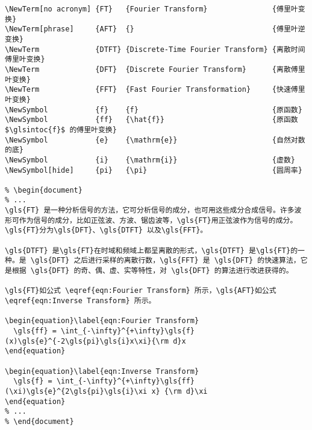 \documentclass{article}
\begin{document}
\begin{lstlisting}[style   = latexcode,
                   caption = {应用举例的 \LaTeX{} 代码},
                   label   = {lst:LaTeX Code of Example}]
% \NewTerm 和 \NewSymbol 需要放在导言区 
\NewTerm[no acronym] {FT}   {Fourier Transform}               {傅里叶变换}
\NewTerm[phrase]     {AFT}  {}                                {傅里叶逆变换}
\NewTerm             {DTFT} {Discrete-Time Fourier Transform} {离散时间傅里叶变换}
\NewTerm             {DFT}  {Discrete Fourier Transform}      {离散傅里叶变换}
\NewTerm             {FFT}  {Fast Fourier Transformation}     {快速傅里叶变换}
\NewSymbol           {f}    {f}                               {原函数}
\NewSymbol           {ff}   {\hat{f}}                         {原函数 $\glsintoc{f}$ 的傅里叶变换}
\NewSymbol           {e}    {\mathrm{e}}                      {自然对数的底}
\NewSymbol           {i}    {\mathrm{i}}                      {虚数}
\NewSymbol[hide]     {pi}   {\pi}                             {圆周率}

% \begin{document}
% ...
\gls{FT} 是一种分析信号的方法，它可分析信号的成分，也可用这些成分合成信号。许多波形可作为信号的成分，比如正弦波、方波、锯齿波等，\gls{FT}用正弦波作为信号的成分。\gls{FT}分为\gls{DFT}、\gls{DTFT} 以及\gls{FFT}。

\gls{DTFT} 是\gls{FT}在时域和频域上都呈离散的形式，\gls{DTFT} 是\gls{FT}的一种。是 \gls{DFT} 之后进行采样的离散行数，\gls{FFT} 是 \gls{DFT} 的快速算法，它是根据 \gls{DFT} 的奇、偶、虚、实等特性，对 \gls{DFT} 的算法进行改进获得的。

\gls{FT}如公式 \eqref{eqn:Fourier Transform} 所示，\gls{AFT}如公式 \eqref{eqn:Inverse Transform} 所示。

\begin{equation}\label{eqn:Fourier Transform}
  \gls{ff} = \int_{-\infty}^{+\infty}\gls{f}(x)\gls{e}^{-2\gls{pi}\gls{i}x\xi}{\rm d}x
\end{equation}

\begin{equation}\label{eqn:Inverse Transform}
  \gls{f} = \int_{-\infty}^{+\infty}\gls{ff}(\xi)\gls{e}^{2\gls{pi}\gls{i}\xi x} {\rm d}\xi
\end{equation}
% ...
% \end{document}
\end{lstlisting}
\end{document}
